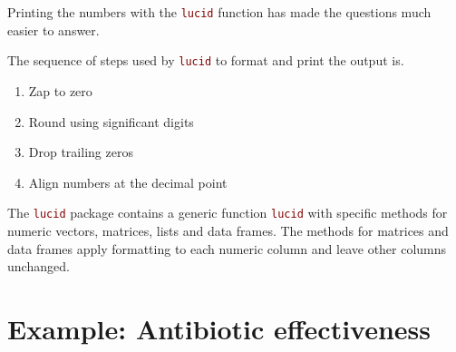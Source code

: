 \documentclass[12pt]{article}\usepackage[]{graphicx}\usepackage[]{color}
\newcommand{\code}[1]{\texttt{\textcolor{maroon}{#1}}}
\begin{document}
Printing the numbers with the \code{lucid} function has made the
questions much easier to answer.


The sequence of steps used by \code{lucid} to format and
print the output is.
\begin{enumerate}
\item{Zap to zero}
\item{Round using significant digits}
\item{Drop trailing zeros}
\item{Align numbers at the decimal point}
\end{enumerate}

The \code{lucid} package contains a generic function \code{lucid} with
specific methods for numeric vectors, matrices, lists and data frames.
The methods for matrices and data frames apply formatting to each
numeric column and leave other columns unchanged.






\section{Example: Antibiotic effectiveness}
\end{document}

